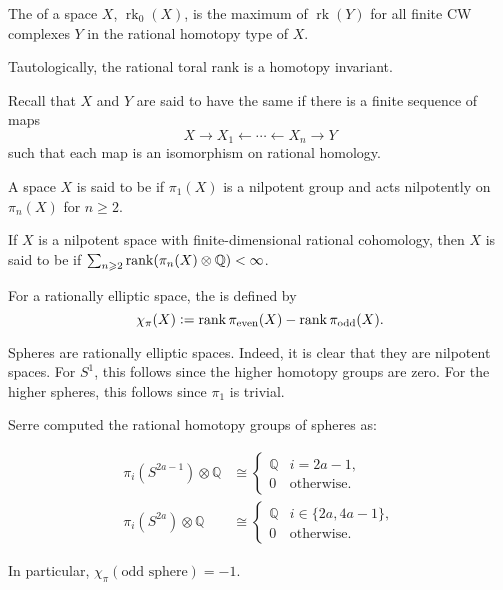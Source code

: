 \documentclass[12pt]{article}
\DeclareMathOperator{\rk}{rk}
\begin{document}
\begin{defn}
	The  of a space $X$, $\rk_{0}(X)$, is the maximum of $\rk(Y)$ for all finite CW complexes $Y$ in the rational homotopy type of $X$.
\end{defn}
Tautologically, the rational toral rank is a homotopy invariant.

Recall that $X$ and $Y$ are said to have the same  if there is a finite sequence of maps
\begin{equation*} 
	X \to X_{1} \leftarrow \cdots \leftarrow X_{n} \to Y
\end{equation*}
such that each map is an isomorphism on rational homology. 

\begin{defn}
	A space $X$ is said to be  if $\pi_{1}(X)$ is a nilpotent group and acts nilpotently on $\pi_{n}(X)$ for $n \ge 2$.

	If $X$ is a nilpotent space with finite-dimensional rational cohomology, then $X$ is said to be  if $\sum_{n \geqslant 2} \operatorname{rank}(\pi_{n}(X) \otimes \mathbb{Q}) < \infty$.

	For a rationally elliptic space, the  is defined by
	\begin{equation*} 
		\chi_{\pi}(X) \vcentcolon= \operatorname{rank} \pi_{\text{even}}(X) - \operatorname{rank} \pi_{\text{odd}}(X).
	\end{equation*}
\end{defn}

\begin{ex}
	Spheres are rationally elliptic spaces. Indeed, it is clear that they are nilpotent spaces. For $S^{1}$, this follows since the higher homotopy groups are zero. For the higher spheres, this follows since $\pi_{1}$ is trivial.

	Serre computed the rational homotopy groups of spheres as:

	\begin{align*} 
		\pi_{i}(S^{2a - 1}) \otimes \mathbb{Q} &\cong 
		\begin{cases}
			\mathbb{Q} & i = 2a - 1, \\
			0 & \text{otherwise}.
		\end{cases}
		\\
		\pi_{i}(S^{2a}) \otimes \mathbb{Q} &\cong 
		\begin{cases}
			\mathbb{Q} & i \in \{2a, 4a - 1\}, \\
			0 & \text{otherwise}.
		\end{cases}
	\end{align*}

	In particular, $\chi_{\pi}(\text{odd sphere}) = -1$.
\end{ex}
\end{document}

